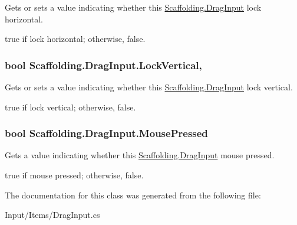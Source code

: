 Gets or sets a value indicating whether this \hyperlink{class_scaffolding_1_1_drag_input}{Scaffolding.\+Drag\+Input} lock horizontal. 

{\ttfamily true} if lock horizontal; otherwise, {\ttfamily false}.\hypertarget{class_scaffolding_1_1_drag_input_a5efcdda6db82447e4e61490c85977180}{
\subsubsection[{Lock\+Vertical}]{\setlength{\rightskip}{0pt plus 5cm}bool Scaffolding.\+Drag\+Input.\+Lock\+Vertical\hspace{0.3cm}{\ttfamily [get]}, {\ttfamily [set]}}}\label{class_scaffolding_1_1_drag_input_a5efcdda6db82447e4e61490c85977180}


Gets or sets a value indicating whether this \hyperlink{class_scaffolding_1_1_drag_input}{Scaffolding.\+Drag\+Input} lock vertical. 

{\ttfamily true} if lock vertical; otherwise, {\ttfamily false}.\hypertarget{class_scaffolding_1_1_drag_input_ab8e2d83d121fbd2b3ad60ef23fe5332f}{
\subsubsection[{Mouse\+Pressed}]{\setlength{\rightskip}{0pt plus 5cm}bool Scaffolding.\+Drag\+Input.\+Mouse\+Pressed\hspace{0.3cm}{\ttfamily [get]}}}\label{class_scaffolding_1_1_drag_input_ab8e2d83d121fbd2b3ad60ef23fe5332f}


Gets a value indicating whether this \hyperlink{class_scaffolding_1_1_drag_input}{Scaffolding.\+Drag\+Input} mouse pressed. 

{\ttfamily true} if mouse pressed; otherwise, {\ttfamily false}.

The documentation for this class was generated from the following file\+:\begin{DoxyCompactItemize}
\item 
Input/\+Items/Drag\+Input.\+cs\end{DoxyCompactItemize}
